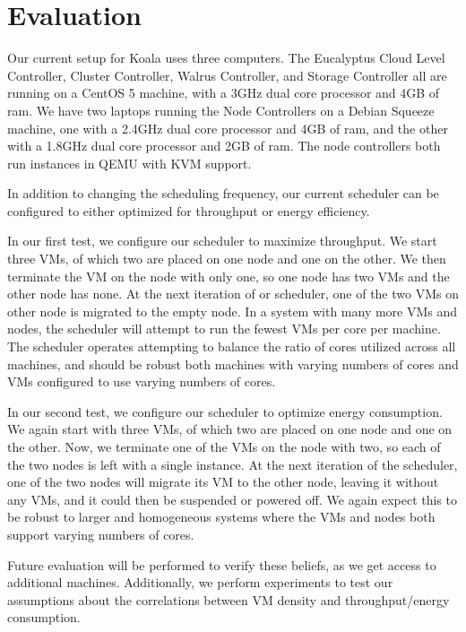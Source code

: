 \section{Evaluation}

Our current setup for Koala uses three computers.  The Eucalyptus Cloud Level Controller, Cluster Controller, Walrus Controller, and Storage Controller all are running on a CentOS 5 machine, with a 3GHz dual core processor and 4GB of ram.  We have two laptops running the Node Controllers on a Debian Squeeze machine, one with a 2.4GHz dual core processor and 4GB of ram, and the other with a 1.8GHz dual core processor and 2GB of ram.  The node controllers both run instances in QEMU with KVM support.  

In addition to changing the scheduling frequency, our current scheduler can be configured to either optimized for throughput or energy efficiency.  

In our first test, we configure our scheduler to maximize throughput.  We start three VMs, of which two are placed on one node and one on the other.  We then terminate the VM on the node with only one, so one node has two VMs and the other node has none.  At the next iteration of or scheduler, one of the two VMs on other node is migrated to the empty node.  In a system with many more VMs and nodes, the scheduler will attempt to run the fewest VMs per core per machine.  The scheduler operates attempting to balance the ratio of cores utilized across all machines, and should be robust both machines with varying numbers of cores and VMs configured to use varying numbers of cores.

In our second test, we configure our scheduler to optimize energy consumption.  We again start with three VMs, of which two are placed on one node and one on the other.  Now, we terminate one of the VMs on the node with two, so each of the two nodes is left with a single instance.  At the next iteration of the scheduler, one of the two nodes will migrate its VM to the other node, leaving it without any VMs, and it could then be suspended or powered off.  We again expect this to be robust to larger and homogeneous systems where the VMs and nodes both support varying numbers of cores.

Future evaluation will be performed to verify these beliefs, as we get access to additional machines.  Additionally, we perform experiments to test our assumptions about the correlations between VM density and throughput/energy consumption.